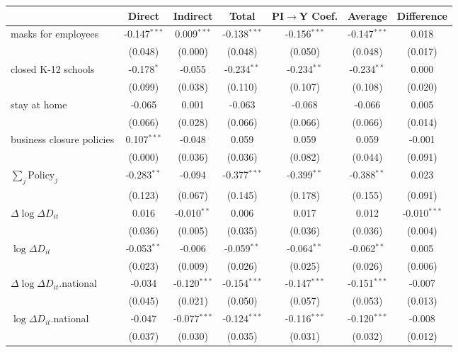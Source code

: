 
\begin{tabular}{lccccc|>{}c}
\toprule
  & Direct & Indirect & Total & PI$\to$Y Coef. & Average & Difference\\
\midrule
masks for employees & -0.147$^{***}$ & 0.009$^{***}$ & -0.138$^{***}$ & -0.156$^{***}$ & -0.147$^{***}$ & 0.018\\
 & (0.048) & (0.000) & (0.048) & (0.050) & (0.048) & (0.017)\\
closed K-12 schools & -0.178$^{*}$ & -0.055 & -0.234$^{**}$ & -0.234$^{**}$ & -0.234$^{**}$ & 0.000\\
 & (0.099) & (0.038) & (0.110) & (0.107) & (0.108) & (0.020)\\
stay at home & -0.065 & 0.001 & -0.063 & -0.068 & -0.066 & 0.005\\
 & (0.066) & (0.028) & (0.066) & (0.066) & (0.066) & (0.014)\\
business closure policies & 0.107$^{***}$ & -0.048 & 0.059 & 0.059 & 0.059 & -0.001\\
 & (0.000) & (0.036) & (0.036) & (0.082) & (0.044) & (0.091)\\
$\sum_j \mathrm{Policy}_j$ & -0.283$^{**}$ & -0.094 & -0.377$^{***}$ & -0.399$^{**}$ & -0.388$^{**}$ & 0.023\\
 & (0.123) & (0.067) & (0.145) & (0.178) & (0.155) & (0.091)\\
$\Delta \log \Delta D_{it}$ & 0.016 & -0.010$^{**}$ & 0.006 & 0.017 & 0.012 & -0.010$^{***}$\\
 & (0.036) & (0.005) & (0.035) & (0.036) & (0.036) & (0.004)\\
$\log \Delta D_{it}$ & -0.053$^{**}$ & -0.006 & -0.059$^{**}$ & -0.064$^{**}$ & -0.062$^{**}$ & 0.005\\
 & (0.023) & (0.009) & (0.026) & (0.025) & (0.026) & (0.006)\\
$\Delta \log \Delta D_{it}$.national & -0.034 & -0.120$^{***}$ & -0.154$^{***}$ & -0.147$^{***}$ & -0.151$^{***}$ & -0.007\\
 & (0.045) & (0.021) & (0.050) & (0.057) & (0.053) & (0.013)\\
$\log \Delta D_{it}$.national & -0.047 & -0.077$^{***}$ & -0.124$^{***}$ & -0.116$^{***}$ & -0.120$^{***}$ & -0.008\\
 & (0.037) & (0.030) & (0.035) & (0.031) & (0.032) & (0.012)\\
\bottomrule
\end{tabular}